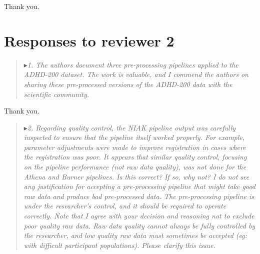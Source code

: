 \documentclass[authoryear,3p]{elsarticle}
\begin{document}
Thank you.

\section{Responses to reviewer 2}

\begin{quote}
$\blacktriangleright$\emph{1. The authors document three pre-processing pipelines applied to the ADHD-200 dataset. The work is valuable, and I commend the authors on sharing these pre-processed versions of the ADHD-200 data with the scientific community.} 
\end{quote}

Thank you. 

\begin{quote}
$\blacktriangleright$\emph{2. Regarding quality control, the NIAK pipeline output was carefully inspected to ensure that the pipeline itself worked properly. For example, parameter adjustments were made to improve registration in cases where the registration was poor. It appears that similar quality control, focusing on the pipeline performance (not raw data quality), was \emph{not} done for the Athena and Burner pipelines. Is this correct? If so, why not? I do not see any justification for accepting a pre-processing pipeline that might take good raw data and produce bad pre-processed data. The pre-processing pipeline is under the researcher's control, and it should be required to operate correctly. Note that I agree with your decision and reasoning not to exclude poor quality raw data. Raw data quality cannot always be fully controlled by the researcher, and low quality raw data must sometimes be accepted (eg: with difficult participant populations). Please clarify this issue.} 
\end{quote}
\end{document}
